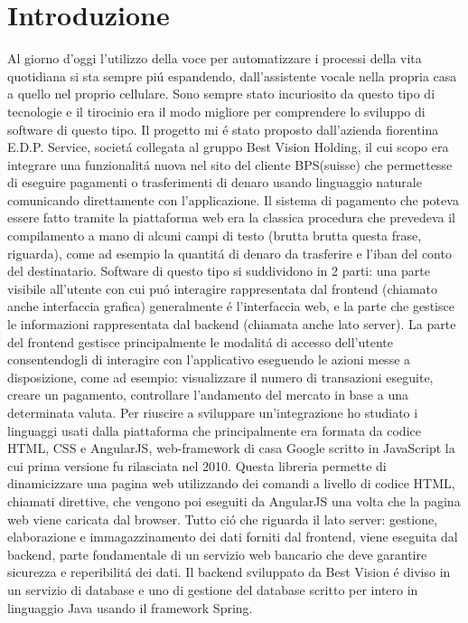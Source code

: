 \chapter{Introduzione}
Al giorno d'oggi l'utilizzo della voce per automatizzare i processi della vita quotidiana si sta sempre pi\'u espandendo, dall'assistente vocale nella propria casa a quello nel proprio cellulare. Sono sempre stato incuriosito da questo tipo di tecnologie e il tirocinio era il modo migliore per comprendere lo sviluppo di software di questo tipo. Il progetto mi \'e stato proposto dall'azienda fiorentina E.D.P. Service, societ\'a collegata al gruppo Best Vision Holding, il cui scopo era integrare una funzionalit\'a nuova nel sito del cliente BPS(suisse) che permettesse di eseguire pagamenti o trasferimenti di denaro usando linguaggio naturale comunicando direttamente con l'applicazione.
Il sistema di pagamento che poteva essere fatto tramite la piattaforma web era la classica procedura che prevedeva il compilamento a mano di alcuni campi di testo (brutta brutta questa frase, riguarda), come ad esempio la quantit\'a di denaro da trasferire e l'iban del conto del destinatario.
Software di questo tipo si suddividono in 2 parti: una parte visibile all'utente con cui pu\'o interagire rappresentata dal frontend (chiamato anche interfaccia grafica) generalmente \'e l'interfaccia web, e la parte che gestisce le informazioni rappresentata dal backend (chiamata anche lato server).
La parte del frontend gestisce principalmente le modalit\'a di accesso dell'utente consentendogli di interagire con l'applicativo eseguendo le azioni messe a disposizione, come ad esempio: visualizzare il numero di transazioni eseguite, creare un pagamento, controllare l'andamento del mercato in base a una determinata valuta. 
Per riuscire a sviluppare un'integrazione ho studiato i linguaggi usati dalla piattaforma che principalmente era formata da codice HTML, CSS e AngularJS, web-framework di casa Google scritto in JavaScript la cui prima versione fu rilasciata nel 2010. Questa libreria permette di dinamicizzare una pagina web utilizzando dei comandi a livello di codice HTML, chiamati direttive, che vengono poi eseguiti da AngularJS una volta che la pagina web viene caricata dal browser.
Tutto ci\'o che riguarda il lato server: gestione, elaborazione e immagazzinamento dei dati forniti dal frontend, viene eseguita dal backend, parte fondamentale di un servizio web bancario che deve garantire sicurezza e reperibilit\'a dei dati. Il backend sviluppato da Best Vision \'e diviso in un servizio di database e uno di gestione del database scritto per intero in linguaggio Java usando il framework Spring. 
